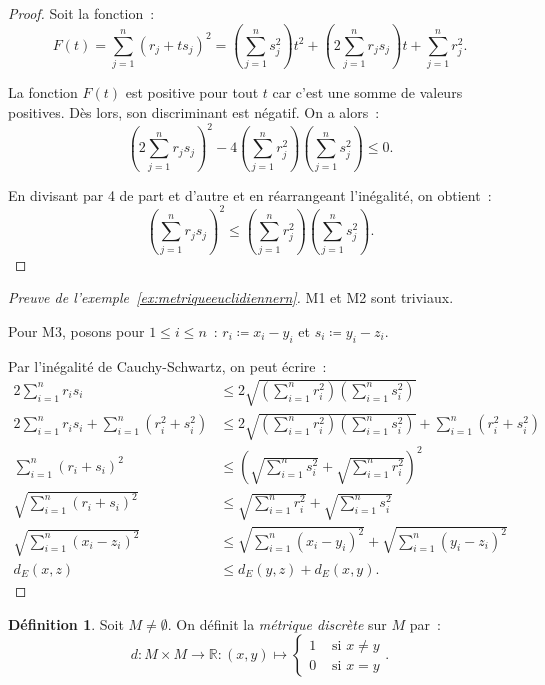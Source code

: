 \documentclass{report}
\theoremstyle{definition}
\newtheorem{déf}[thm]{Définition}
\theoremstyle{remark}
\newcommand{\R}{\mathbb R}
\begin{document}
		\begin{proof} Soit la fonction~:
		\[F(t) = \sum_{j=1}^n(r_j + ts_j)^2 = \left(\sum_{j=1}^ns_j^2\right)t^2 + \left(2\sum_{j=1}^nr_js_j\right)t + \sum_{j=1}^nr_j^2.\]

		La fonction $F(t)$ est positive pour tout $t$ car c'est une somme de valeurs positives. Dès lors, son discriminant est négatif. On a alors~:
		\[\left(2\sum_{j=1}^nr_js_j\right)^2 - 4\left(\sum_{j=1}^nr_j^2\right)\left(\sum_{j=1}^ns_j^2\right) \leq 0.\]

		En divisant par 4 de part et d'autre et en réarrangeant l'inégalité, on obtient~:
		\[\left(\sum_{j=1}^nr_js_j\right)^2 \leq \left(\sum_{j=1}^nr_j^2\right)\left(\sum_{j=1}^ns_j^2\right).\]
		\end{proof}

		\begin{proof}[Preuve de l'exemple~\ref{ex:metriqueeuclidiennern}] M1 et M2 sont triviaux.

		Pour M3, posons pour $1 \leq i \leq n$~: $r_i \coloneqq x_i - y_i$ et $s_i \coloneqq y_i - z_i$.

		Par l'inégalité de Cauchy-Schwartz, on peut écrire~:
		\begin{align*}
			2\sum_{i=1}^nr_is_i &\leq 2\sqrt {\left(\sum_{i=1}^nr_i^2\right)\left(\sum_{i=1}^ns_i^2\right)} \\
			2\sum_{i=1}^nr_is_i + \sum_{i=1}^n(r_i^2+s_i^2) &\leq 2\sqrt{\left(\sum_{i=1}^nr_i^2\right)\left(\sum_{i=1}^ns_i^2\right)} + \sum_{i=1}^n(r_i^2+s_i^2) \\
			\sum_{i=1}^n(r_i+s_i)^2 &\leq \left(\sqrt {\sum_{i=1}^ns_i^2} + \sqrt {\sum_{i=1}^nr_i^2}\right)^2 \\
			\sqrt {\sum_{i=1}^n(r_i+s_i)^2} &\leq \sqrt {\sum_{i=1}^nr_i^2} + \sqrt {\sum_{i=1}^ns_i^2} \\
			\sqrt {\sum_{i=1}^n(x_i-z_i)^2} &\leq \sqrt {\sum_{i=1}^n(x_i-y_i)^2} + \sqrt {\sum_{i=1}^n(y_i-z_i)^2} \\
			d_E(x, z) &\leq d_E(y, z) + d_E(x, y).
		\end{align*}
		\end{proof}

		\begin{déf}\label{déf:métriquediscrète} Soit $M \neq \emptyset$. On définit la \textit{métrique discrète} sur $M$ par~:
		\[d : M \times M \to \R : (x, y) \mapsto \begin{cases} 1 &\text{ si } x \neq y \\ 0 &\text{ si } x = y \end{cases}.\]
		\end{déf}
\end{document}
